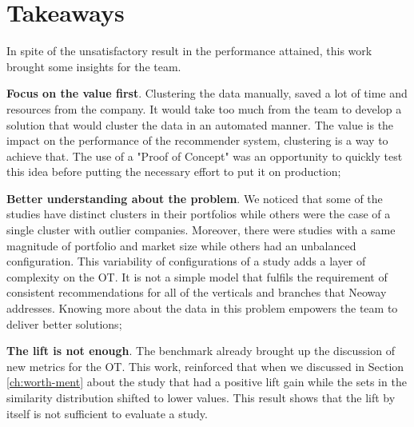 \section{Takeaways}

In spite of the unsatisfactory result in the performance attained, this work brought some insights for the team.

\textbf{Focus on the value first}. Clustering the data manually, saved a lot of time and resources from the company. It would take too much from the team to develop a solution that would cluster the data in an automated manner. The value is the impact on the performance of the recommender system, clustering is a way to achieve that. The use of a "Proof of Concept" was an opportunity to quickly test this idea before putting the necessary effort to put it on production;

\textbf{Better understanding about the problem}. We noticed that some of the studies have distinct clusters in their portfolios while others were the case of a single cluster with outlier companies. Moreover, there were studies with a same magnitude of portfolio and market size while others had an unbalanced configuration. This variability of configurations of a study adds a layer of complexity on the OT. It is not a simple model that fulfils the requirement of consistent recommendations for all of the verticals and branches that Neoway addresses. Knowing more about the data in this problem empowers the team to deliver better solutions;

\textbf{The lift is not enough}. The benchmark already brought up the discussion of new metrics for the OT. This work, reinforced that when we discussed in Section \ref{ch:worth-ment} about the study that had a positive lift gain while the sets in the similarity distribution shifted to lower values. This result shows that the lift by itself is not sufficient to evaluate a study.




